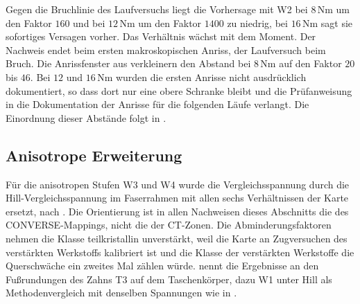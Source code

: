 Gegen die Bruchlinie des Laufversuchs liegt die Vorhersage mit W2 bei $8$\,Nm um den Faktor $160$ und bei $12$\,Nm um den Faktor $1400$ zu niedrig, bei $16$\,Nm sagt sie sofortiges Versagen vorher. Das Verhältnis wächst mit dem Moment. Der Nachweis endet beim ersten makroskopischen Anriss, der Laufversuch beim Bruch. Die Anrissfenster aus  verkleinern den Abstand bei $8$\,Nm auf den Faktor $20$ bis $46$. Bei $12$ und $16$\,Nm wurden die ersten Anrisse nicht ausdrücklich dokumentiert, so dass dort nur eine obere Schranke bleibt und die Prüfanweisung in  die Dokumentation der Anrisse für die folgenden Läufe verlangt. Die Einordnung dieser Abstände folgt in .


\subsection{Anisotrope Erweiterung}
\label{sec:stommel_anisotrop}

Für die anisotropen Stufen W3 und W4 wurde die Vergleichsspannung durch die Hill-Vergleichs\-spannung im Faserrahmen mit allen sechs Verhältnissen der Karte ersetzt, nach . Die Orientierung ist in allen Nachweisen dieses Abschnitts die des CONVERSE-Mappings, nicht die der CT-Zonen. Die Abminderungsfaktoren nehmen die Klasse teilkristallin unverstärkt, weil die Karte an Zugversuchen des verstärkten Werkstoffs kalibriert ist und die Klasse der verstärkten Werkstoffe die Querschwäche ein zweites Mal zählen würde.  nennt die Ergebnisse an den Fußrundungen des Zahns T3 auf dem Taschenkörper, dazu W1 unter Hill als Methodenvergleich mit denselben Spannungen wie in .

